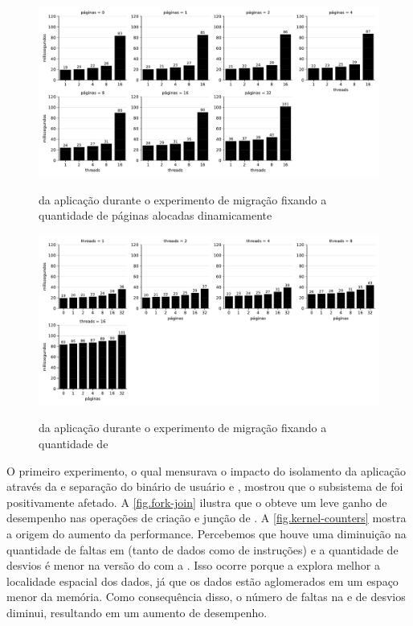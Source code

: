 \begin{figure}[tb]
    \centering
    \caption{\Downtime da aplicação durante o experimento de migração fixando a quantidade de páginas alocadas dinamicamente}
    \includegraphics[width=\linewidth]{content/images/multiple_threads_pages.pdf}
    \label{fig.mtpages}
\end{figure}

\begin{figure}[tb]
    \centering
    \caption{\Downtime da aplicação durante o experimento de migração fixando a quantidade de \threads}
    \includegraphics[width=\linewidth]{content/images/multiple_threads_threads.pdf}
    \label{fig.mtthreads}
\end{figure}

O primeiro experimento, o qual mensurava o impacto do isolamento da aplicação através da \uarea e separação do binário de usuário e , mostrou que o subsistema de \threads foi positivamente afetado. A \autoref{fig.fork-join} ilustra que o \nanvix obteve um leve ganho de desempenho nas operações de criação e junção de \threads. A \autoref{fig.kernel-counters} mostra a origem do aumento da performance. Percebemos que houve uma diminuição na quantidade de faltas em \cache (tanto de dados como de instruções) e a quantidade de desvios é menor na versão do \nanvix com a \uarea. Isso ocorre porque a \uarea explora melhor a localidade espacial dos dados, já que os dados estão aglomerados em um espaço menor da memória. Como consequência disso, o número de faltas na \cache e de desvios diminui, resultando em um aumento de desempenho.


